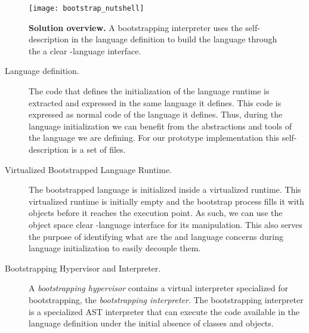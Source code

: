 \begin{figure}[ht]
\center
\texttt{[image: bootstrap\_nutshell]}
\caption{\textbf{Solution overview.} A bootstrapping interpreter uses the self-description in the language definition to build the language through the a clear \VM-language interface.\label{fig:bootstrapping_overview}}
\end{figure}

\begin{description}
\item[Language definition.] The code that defines the initialization of the language runtime is extracted and expressed in the same language it defines. This code is expressed as normal code of the language it defines. Thus, during the language initialization we can benefit from the abstractions and tools of the language we are defining. For our prototype implementation this self-description is a set of files.

\item[Virtualized Bootstrapped Language Runtime.] The bootstrapped language is initialized inside a virtualized runtime. This virtualized runtime is initially empty and the bootstrap process fills it with objects before it reaches the execution point. As such, we can use the object space clear \VM-language interface for its manipulation. This also serves the purpose of identifying what are the \VM and language concerns during language initialization to easily decouple them.

\item[Bootstrapping Hypervisor and Interpreter.] A \emph{bootstrapping hypervisor} contains a virtual interpreter specialized for bootstrapping, the \emph{bootstrapping interpreter}. The bootstrapping interpreter is a specialized AST interpreter that can execute the code available in the language definition under the initial absence of classes and objects.
\end{description}



